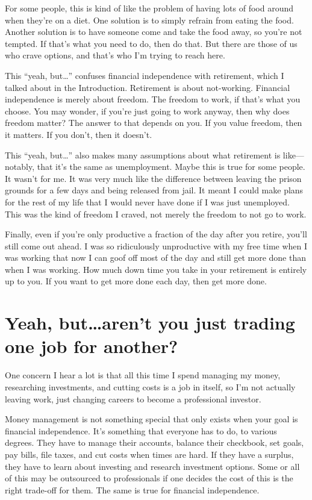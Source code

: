 For some people, this is kind of like the problem of having lots of food around when they're on a diet. One solution is to simply refrain from eating the food. Another solution is to have someone come and take the food away, so you're not tempted. If that's what you need to do, then do that. But there are those of us who crave options, and that's who I'm trying to reach here.

This ``yeah, but\ldots'' confuses financial independence with retirement, which I talked about in the Introduction. Retirement is about not-working. Financial independence is merely about freedom. The freedom to work, if that's what you choose. You may wonder, if you're just going to work anyway, then why does freedom matter? The answer to that depends on you. If you value freedom, then it matters. If you don't, then it doesn't.

This ``yeah, but\ldots'' also makes many assumptions about what retirement is like---notably, that it's the same as unemployment. Maybe this is true for some people. It wasn't for me. It was very much like the difference between leaving the prison grounds for a few days and being released from jail. It meant I could make plans for the rest of my life that I would never have done if I was just unemployed. This was the kind of freedom I craved, not merely the freedom to not go to work.

Finally, even if you're only productive a fraction of the day after you retire, you'll still come out ahead. I was so ridiculously unproductive with my free time when I was working that now I can goof off most of the day and still get more done than when I was working. How much down time you take in your retirement is entirely up to you. If you want to get more done each day, then get more done.

\section{Yeah, but\ldots aren't you just trading one job for another?}
One concern I hear a lot is that all this time I spend managing my money, researching investments, and cutting costs is a job in itself, so I'm not actually leaving work, just changing careers to become a professional investor.

Money management is not something special that only exists when your goal is financial independence. It's something that everyone has to do, to various degrees. They have to manage their accounts, balance their checkbook, set goals, pay bills, file taxes, and cut costs when times are hard. If they have a surplus, they have to learn about investing and research investment options. Some or all of this may be outsourced to professionals if one decides the cost of this is the right trade-off for them. The same is true for financial independence.

